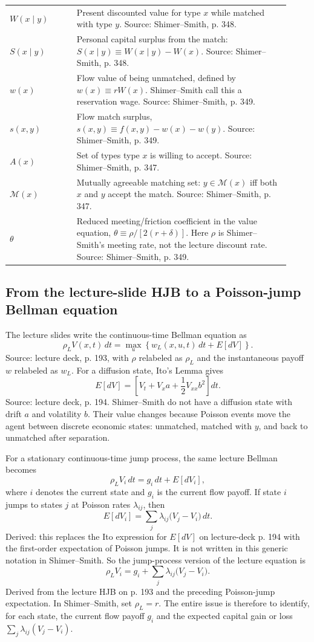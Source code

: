 \documentclass[11pt]{article}
\newcommand{\M}{\mathcal{M}}
\begin{document}
\begin{center}
\begin{tabular}{>{\raggedright\arraybackslash}p{0.22\linewidth}
                >{\raggedright\arraybackslash}p{0.70\linewidth}}
$W(x\mid y)$ & Present discounted value for type $x$ while matched with type $y$. Source: Shimer--Smith, p. 348. \\
$S(x\mid y)$ & Personal capital surplus from the match: $S(x\mid y)\equiv W(x\mid y)-W(x)$. Source: Shimer--Smith, p. 348. \\
$w(x)$ & Flow value of being unmatched, defined by $w(x)\equiv rW(x)$. Shimer--Smith call this a reservation wage. Source: Shimer--Smith, p. 349. \\
$s(x,y)$ & Flow match surplus, $s(x,y)\equiv f(x,y)-w(x)-w(y)$. Source: Shimer--Smith, p. 349. \\
$A(x)$ & Set of types type $x$ is willing to accept. Source: Shimer--Smith, p. 347. \\
$\M(x)$ & Mutually agreeable matching set: $y\in\M(x)$ iff both $x$ and $y$ accept the match. Source: Shimer--Smith, p. 347. \\
$\theta$ & Reduced meeting/friction coefficient in the value equation, $\theta\equiv \rho/[2(r+\delta)]$. Here $\rho$ is Shimer--Smith's meeting rate, not the lecture discount rate. Source: Shimer--Smith, p. 349. \\
\bottomrule
\end{tabular}
\end{center}

\subsection{From the lecture-slide HJB to a Poisson-jump Bellman equation}

The lecture slides write the continuous-time Bellman equation as
\[
\rho_L V(x,t)\,dt
=
\max_u\left\{w_L(x,u,t)\,dt+E[dV]\right\}.
\]
Source: lecture deck, p. 193, with $\rho$ relabeled as $\rho_L$ and the
instantaneous payoff $w$ relabeled as $w_L$.
For a diffusion state, Ito's Lemma gives
\[
E[dV]
=
\left[
V_t+V_xa+\frac{1}{2}V_{xx}b^2
\right]dt.
\]
Source: lecture deck, p. 194. Shimer--Smith do not have a diffusion state
with drift $a$ and volatility $b$. Their value changes because Poisson events move
the agent between discrete economic states: unmatched, matched with $y$, and
back to unmatched after separation.

For a stationary continuous-time jump process, the same lecture Bellman becomes
\[
\rho_L V_i\,dt
=
g_i\,dt+E[dV_i],
\]
where $i$ denotes the current state and $g_i$ is the current flow payoff. If state
$i$ jumps to states $j$ at Poisson rates $\lambda_{ij}$, then
\[
E[dV_i]
=
\sum_j \lambda_{ij}\bigl(V_j-V_i\bigr)\,dt.
\]
Derived: this replaces the Ito expression for $E[dV]$ on lecture-deck p. 194
with the first-order expectation of Poisson jumps. It is not written in this
generic notation in Shimer--Smith.
So the jump-process version of the lecture equation is
\[
\rho_L V_i
=
g_i+\sum_j \lambda_{ij}\bigl(V_j-V_i\bigr).
\]
Derived from the lecture HJB on p. 193 and the preceding Poisson-jump
expectation.
In Shimer--Smith, set $\rho_L=r$. The entire issue is therefore to identify, for
each state, the current flow payoff $g_i$ and the expected capital gain or loss
$\sum_j \lambda_{ij}(V_j-V_i)$.
\end{document}
